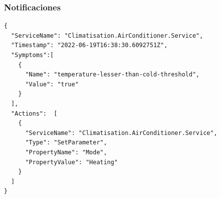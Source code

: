 \pagebreak

\subsubsection{Notificaciones}

\newsavebox\executenotificationbox
\begin{lrbox}{\executenotificationbox}
  \begin{minipage}[t]{2in}
    \begin{verbatim}
{
  "ServiceName": "Climatisation.AirConditioner.Service",
  "Timestamp": "2022-06-19T16:38:30.6092751Z",
  "Symptoms":[
    {
      "Name": "temperature-lesser-than-cold-threshold",
      "Value": "true"
    }
  ],
  "Actions":  [
    {
      "ServiceName": "Climatisation.AirConditioner.Service",
      "Type": "SetParameter",
      "PropertyName": "Mode",
      "PropertyValue": "Heating"
    }
  ]
}
        \end{verbatim}
  \end{minipage}
\end{lrbox}

